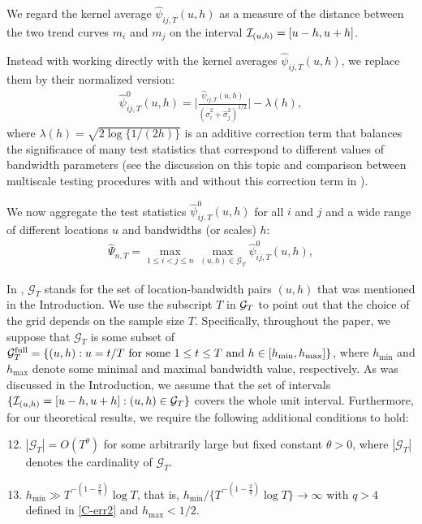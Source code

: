 \documentclass[a4paper,12pt]{article}
\makeatletter
\renewcommand{\eqref}[1]{\tagform@{\ref{#1}}}
\makeatother
\begin{document}
We regard the kernel average $\widehat{\psi}_{ij,T}(u,h)$ as a measure of the distance between the two trend curves $m_i$ and $m_j$ on the interval $\mathcal{I}_{(u, h)} = [u-h,u+h]$.

Instead with working directly with the kernel averages $\widehat{\psi}_{ij,T}(u,h)$, we replace them by their normalized version:
\begin{align}\label{eq:psi_zero_ij}
\hat{\psi}^0_{ij,T}(u, h) =  \Big|\frac{\widehat{\psi}_{ij,T}(u,h)}{(\widehat{\sigma}_i^2 + \widehat{\sigma}_j^2)^{1/2}}\Big| - \lambda(h),
\end{align}
where $\lambda(h) = \sqrt{2 \log \{ 1/(2h) \}}$ is an additive correction term that balances the significance of many test statistics that correspond to different values of bandwidth parameters (see the discussion on this topic and comparison between multiscale testing procedures with and without this correction term in \citet{KhismatullinaVogt2020}).

We now aggregate the test statistics $\hat{\psi}^0_{ij, T}(u,h)$ for all $i$ and $j$ and a wide range of different locations $u$ and bandwidths (or scales) $h$:
\begin{align}\label{eq:Psi_hat}
	\widehat{\Psi}_{n,T} = \max_{1 \le i < j \le n}\max_{(u,h) \in \mathcal{G}_T} \hat{\psi}^0_{ij,T}(u, h),
\end{align}

In \eqref{eq:Psi_hat}, $\mathcal{G}_T$ stands for the set of location-bandwidth pairs $(u, h)$ that was mentioned in the Introduction. We use the subscript $T$ in $\mathcal{G}_T$ to point out that the choice of the grid depends on the sample size $T$. Specifically, throughout the paper, we suppose that $\mathcal{G}_T$ is some subset of $\mathcal{G}_T^{\text{full}} = \{ (u,h): u = t/T \text{ for some } 1 \le t \le T \text{ and }\linebreak h \in [h_{\min},h_{\max}] \}$, where $h_{\min}$ and $h_{\max}$ denote some minimal and maximal bandwidth value, respectively. As was discussed in the Introduction, we assume that the set of intervals $\{\mathcal{I}_{(u, h)} = [u-h, u+h]: (u, h) \in \mathcal{G}_T\}$ covers the whole unit interval. Furthermore, for our theoretical results, we require the following additional conditions to hold:
\begin{enumerate}[label=(C\arabic*),leftmargin=1.05cm]
\setcounter{enumi}{11}

\item \label{C-grid} $|\mathcal{G}_T| = O(T^\theta)$ for some arbitrarily large but fixed constant $\theta > 0$, where $|\mathcal{G}_T|$ denotes the cardinality of $\mathcal{G}_T$. 

\item \label{C-h} $h_{\min} \gg T^{-(1-\frac{2}{q})} \log T$, that is, $h_{\min} / \{ T^{-(1-\frac{2}{q})} \log T \} \rightarrow \infty$ with $q > 4$ defined in \ref{C-err2} and $h_{\max} < 1/2$.

\end{enumerate}
\end{document}
